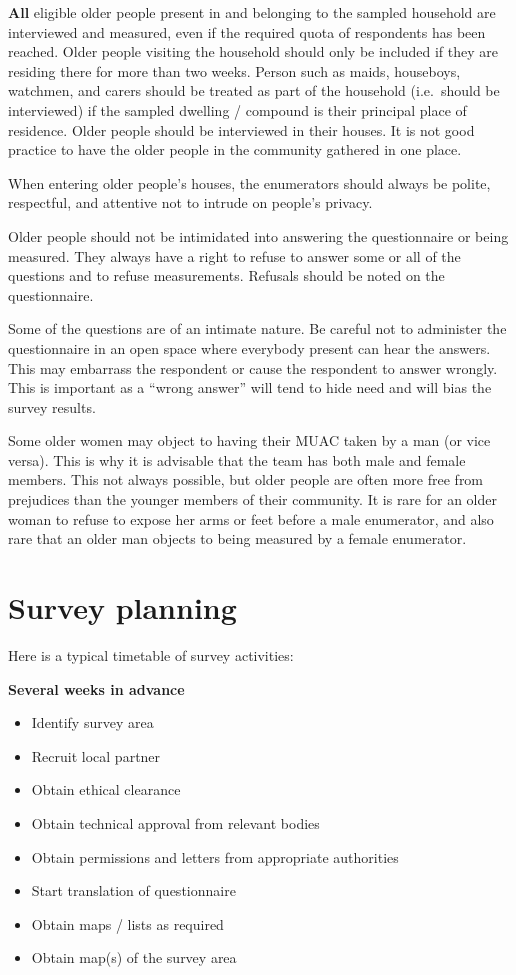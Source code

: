 \documentclass[12pt,a4paper]{book}
\providecommand{\tightlist}{%
  \setlength{\itemsep}{0pt}\setlength{\parskip}{0pt}}
\begin{document}
\textbf{All} eligible older people present in and belonging to the sampled household are interviewed and measured, even if the required quota of respondents has been reached. Older people visiting the household should only be included if they are residing there for more than two weeks. Person such as maids, houseboys, watchmen, and carers should be treated as part of the household (i.e.~should be interviewed) if the sampled dwelling / compound is their principal place of residence. Older people should be interviewed in their houses. It is not good practice to have the older people in the community gathered in one place.

When entering older people's houses, the enumerators should always be polite, respectful, and attentive not to intrude on people's privacy.

Older people should not be intimidated into answering the questionnaire or being measured. They always have a right to refuse to answer some or all of the questions and to refuse measurements. Refusals should be noted on the questionnaire.

Some of the questions are of an intimate nature. Be careful not to administer the questionnaire in an open space where everybody present can hear the answers. This may embarrass the respondent or cause the respondent to answer wrongly. This is important as a ``wrong answer'' will tend to hide need and will bias the survey results.

Some older women may object to having their MUAC taken by a man (or vice versa). This is why it is advisable that the team has both male and female members. This not always possible, but older people are often more free from prejudices than the younger members of their community. It is rare for an older woman to refuse to expose her arms or feet before a male enumerator, and also rare that an older man objects to being measured by a female enumerator.

\newpage

\hypertarget{survey-planning}{%
\section{Survey planning}\label{survey-planning}}

Here is a typical timetable of survey activities:

\textbf{Several weeks in advance}

\begin{itemize}
\tightlist
\item
  Identify survey area
\item
  Recruit local partner
\item
  Obtain ethical clearance
\item
  Obtain technical approval from relevant bodies
\item
  Obtain permissions and letters from appropriate authorities
\item
  Start translation of questionnaire
\item
  Obtain maps / lists as required
\item
  Obtain map(s) of the survey area
\end{itemize}
\end{document}
